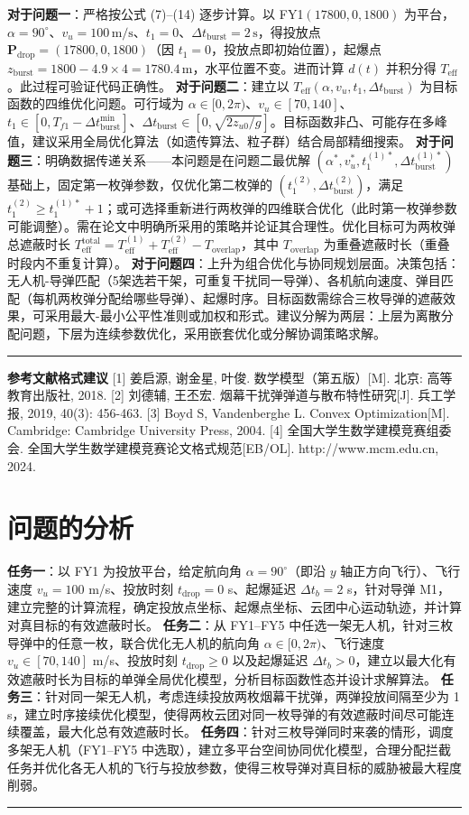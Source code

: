 \documentclass{JXUSTmodeling}
\begin{document}
\textbf{对于问题一}：严格按公式 (7)–(14) 逐步计算。以 FY1$(17800, 0, 1800)$ 为平台，$\alpha=90^\circ$、$v_u=100\,\text{m/s}$、$t_1=0$、$\Delta t_{\text{burst}}=2\,\text{s}$，得投放点 $\mathbf{P}_{\text{drop}} = (17800, 0, 1800)$（因 $t_1=0$，投放点即初始位置），起爆点 $z_{\text{burst}} = 1800 - 4.9\times 4 = 1780.4\,\text{m}$，水平位置不变。进而计算 $d(t)$ 并积分得 $T_{\text{eff}}$。此过程可验证代码正确性。
\textbf{对于问题二}：建立以 $T_{\text{eff}}(\alpha, v_u, t_1, \Delta t_{\text{burst}})$ 为目标函数的四维优化问题。可行域为 $\alpha\in[0,2\pi)$、$v_u\in[70,140]$、$t_1\in[0,T_{f1}-\Delta t_{\text{burst}}^{\min}]$、$\Delta t_{\text{burst}}\in[0,\sqrt{2z_{u0}/g}]$。目标函数非凸、可能存在多峰值，建议采用全局优化算法（如遗传算法、粒子群）结合局部精细搜索。
\textbf{对于问题三}：明确数据传递关系——本问题是在问题二最优解 $(\alpha^*, v_u^*, t_1^{(1)*}, \Delta t_{\text{burst}}^{(1)*})$ 基础上，固定第一枚弹参数，仅优化第二枚弹的 $(t_1^{(2)}, \Delta t_{\text{burst}}^{(2)})$，满足 $t_1^{(2)} \geq t_1^{(1)*} + 1$；或可选择重新进行两枚弹的四维联合优化（此时第一枚弹参数可能调整）。需在论文中明确所采用的策略并论证其合理性。优化目标可为两枚弹总遮蔽时长 $T_{\text{eff}}^{\text{total}} = T_{\text{eff}}^{(1)} + T_{\text{eff}}^{(2)} - T_{\text{overlap}}$，其中 $T_{\text{overlap}}$ 为重叠遮蔽时长（重叠时段内不重复计算）。
\textbf{对于问题四}：上升为组合优化与协同规划层面。决策包括：无人机-导弹匹配（5架选若干架，可重复干扰同一导弹）、各机航向速度、弹目匹配（每机两枚弹分配给哪些导弹）、起爆时序。目标函数需综合三枚导弹的遮蔽效果，可采用最大-最小公平性准则或加权和形式。建议分解为两层：上层为离散分配问题，下层为连续参数优化，采用嵌套优化或分解协调策略求解。
\noindent\rule{\textwidth}{0.4pt}
\textbf{参考文献格式建议}
[1] 姜启源, 谢金星, 叶俊. 数学模型（第五版）[M]. 北京: 高等教育出版社, 2018.
[2] 刘德辅, 王丕宏. 烟幕干扰弹弹道与散布特性研究[J]. 兵工学报, 2019, 40(3): 456-463.
[3] Boyd S, Vandenberghe L. Convex Optimization[M]. Cambridge: Cambridge University Press, 2004.
[4] 全国大学生数学建模竞赛组委会. 全国大学生数学建模竞赛论文格式规范[EB/OL]. http://www.mcm.edu.cn, 2024.
\section{问题的分析}
\textbf{任务一}：以 FY1 为投放平台，给定航向角 $\alpha = 90^\circ$（即沿 $y$ 轴正方向飞行）、飞行速度 $v_u = 100$ m/s、投放时刻 $t_{\text{drop}} = 0$ s、起爆延迟 $\Delta t_b = 2$ s，针对导弹 M1，建立完整的计算流程，确定投放点坐标、起爆点坐标、云团中心运动轨迹，并计算对真目标的有效遮蔽时长。
\textbf{任务二}：从 FY1–FY5 中任选一架无人机，针对三枚导弹中的任意一枚，联合优化无人机的航向角 $\alpha \in [0, 2\pi)$、飞行速度 $v_u \in [70, 140]$ m/s、投放时刻 $t_{\text{drop}} \geq 0$ 以及起爆延迟 $\Delta t_b > 0$，建立以最大化有效遮蔽时长为目标的单弹全局优化模型，分析目标函数性态并设计求解算法。
\textbf{任务三}：针对同一架无人机，考虑连续投放两枚烟幕干扰弹，两弹投放间隔至少为 1 s，建立时序接续优化模型，使得两枚云团对同一枚导弹的有效遮蔽时间尽可能连续覆盖，最大化总有效遮蔽时长。
\textbf{任务四}：针对三枚导弹同时来袭的情形，调度多架无人机（FY1–FY5 中选取），建立多平台空间协同优化模型，合理分配拦截任务并优化各无人机的飞行与投放参数，使得三枚导弹对真目标的威胁被最大程度削弱。
\noindent\rule{\textwidth}{0.4pt}
\end{document}
